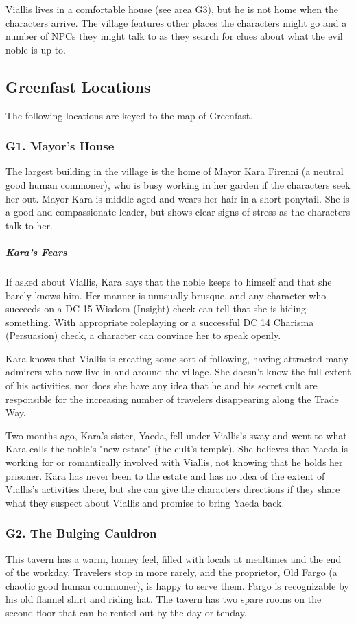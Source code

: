 \documentclass[10pt,a4paper,twoside,bg=print,twocolumn,openany,nodeprecatedcode]{dndbook}
\begin{document}
Viallis lives in a comfortable house (see area G3), but he is not home when the characters arrive. The village features other places the characters might go and a number of NPCs they might talk to as they search for clues about what the evil noble is up to.

\subsection{Greenfast Locations}
The following locations are keyed to the map of Greenfast.

\subsubsection{G1. Mayor's House}
The largest building in the village is the home of Mayor Kara Firenni (a neutral good human commoner), who is busy working in her garden if the characters seek her out. Mayor Kara is middle-aged and wears her hair in a short ponytail. She is a good and compassionate leader, but shows clear signs of stress as the characters talk to her.

\subparagraph{Kara's Fears}
If asked about Viallis, Kara says that the noble keeps to himself and that she barely knows him. Her manner is unusually brusque, and any character who succeeds on a DC 15 Wisdom (Insight) check can tell that she is hiding something. With appropriate roleplaying or a successful DC 14 Charisma (Persuasion) check, a character can convince her to speak openly.

Kara knows that Viallis is creating some sort of following, having attracted many admirers who now live in and around the village. She doesn't know the full extent of his activities, nor does she have any idea that he and his secret cult are responsible for the increasing number of travelers disappearing along the Trade Way.

Two months ago, Kara's sister, Yaeda, fell under Viallis's sway and went to what Kara calls the noble's "new estate" (the cult's temple). She believes that Yaeda is working for or romantically involved with Viallis, not knowing that he holds her prisoner. Kara has never been to the estate and has no idea of the extent of Viallis's activities there, but she can give the characters directions if they share what they suspect about Viallis and promise to bring Yaeda back.

\subsubsection{G2. The Bulging Cauldron}
This tavern has a warm, homey feel, filled with locals at mealtimes and the end of the workday. Travelers stop in more rarely, and the proprietor, Old Fargo (a chaotic good human commoner), is happy to serve them. Fargo is recognizable by his old flannel shirt and riding hat. The tavern has two spare rooms on the second floor that can be rented out by the day or tenday.
\end{document}
